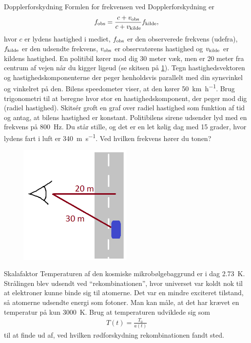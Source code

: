 \documentclass[crop=false, class=memoir]{standalone}
\begin{document}
\begin{opgave}[2]{Dopplerforskydning}%
	Formlen for frekvensen ved Dopplerforskydning er
	\begin{align}
		f_\textup{obs} = \frac{c+v_\textup{obs}}{c+v_\textup{kilde}} f_\textup{kilde},
	\end{align}
	hvor $c$ er lydens hastighed i mediet, $f_\textup{obs}$ er den observerede frekvens (udefra), $f_\textup{kilde}$ er den udsendte frekvens, $v_\textup{obs}$ er observatørens hastighed og $v_\textup{kilde}$ er kildens hastighed.
	\opg En politibil kører mod dig 30 meter væk, men er 20 meter fra centrum af vejen når du kigger ligeud (se skitsen på \cref{politi}). Tegn hastighedsvektoren og hastighedskomponenterne der peger henholdsvis parallelt med din synsvinkel og vinkelret på den. 
	\opg Bilens speedometer viser, at den kører \SI{50}{\km\per\hour}. Brug trigonometri til at beregne hvor stor en hastighedskomponent, der peger mod dig (radiel hastighed). Skitsér groft en graf over radiel hastighed som funktion af tid og antag, at bilens hastighed er konstant.
	\opg Politibilens sirene udsender lyd med en frekvens på \SI{800}{\hertz}. Du står stille, og det er en let kølig dag med 15 grader, hvor lydens fart i luft er \SI{340}{\metre\per\second}. Ved hvilken frekvens hører du tonen?
	\begin{figure}[]
		\centering
		\includegraphics[width=0.5\textwidth]{Kosmo/kosmofig/Politi.png}
		\caption{}
		\label{politi}
	\end{figure}
\end{opgave}

\begin{opgave}[1]{Skalafaktor}%
	Temperaturen af den kosmiske mikrobølgebaggrund er i dag \SI{2.73}{\kelvin}. Strålingen blev udsendt ved ``rekombinationen'', hvor universet var koldt nok til at elektroner kunne binde sig til atomerne. Det var en mindre exciteret tilstand, så atomerne udsendte energi som fotoner. Man kan måle, at det har krævet en temperatur på kun \SI{3000}{\kelvin}. Brug at temperaturen udviklede sig som
	\begin{align}
		T(t)=\frac{T_0}{a(t)}
	\end{align}
	til at finde ud af, ved hvilken rødforskydning rekombinationen fandt sted.
\end{opgave}
\end{document}
